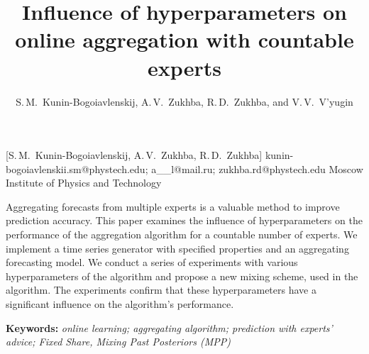 \documentclass[12pt, twoside]{article}
\begin{document}
\English

\title
    [] %
    {Influence of hyperparameters on online aggregation with countable experts} %
\author
    [S.\,M.~Kunin-Bogoiavlenskij] %
    {S.\,M.~Kunin-Bogoiavlenskij, A.\,V.~Zukhba, R.\,D.~Zukhba, and V.\,V.~V’yugin} %
    [S.\,M.~Kunin-Bogoiavlenskij, A.\,V.~Zukhba, R.\,D.~Zukhba] %
\email
    {kunin-bogoiavlenskii.sm@phystech.edu; a\_\_l@mail.ru; zukhba.rd@phystech.edu}
\organization
    {Moscow Institute of Physics and Technology}
\abstract
    {

    Aggregating forecasts from multiple experts is a valuable method to improve prediction accuracy.
    This paper examines the influence of hyperparameters on the performance of the aggregation algorithm for a countable number of experts.
    We implement a time series generator with specified properties and an aggregating forecasting model. 
    We conduct a series of experiments with various hyperparameters of the algorithm and propose a new mixing scheme, used in the algorithm.
    The experiments confirm that these hyperparameters have a significant influence on the algorithm's performance.           
        
%   
%   
%   
%               
    \noindent
        \textbf{Keywords:} \emph{online learning; aggregating algorithm; prediction with experts’ advice; Fixed Share, Mixing Past Posteriors (MPP)}}

\end{document}
